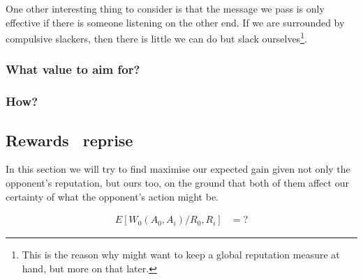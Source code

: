 \documentclass[10pt,fleqn]{article}
\begin{document}
One other interesting thing to consider is that the message we pass is only
effective if there is someone listening on the other end. If we are surrounded
by compulsive slackers, then there is little we can do but slack
ourselves\footnote{This is the reason why might want to keep a global reputation
measure at hand, but more on that later.}.


\subsubsection{What value to aim for?}

\subsubsection{How?}

\subsection{Rewards \dash\ reprise}

In this section we will try to find maximise our expected gain given not only the
opponent's reputation, but ours too, on the ground that both of them affect our
certainty of what the opponent's action might be.

\begin{align*}
  E[W_0(A_0, A_i) / R_0, R_i] &= ?
\end{align*}
\end{document}
